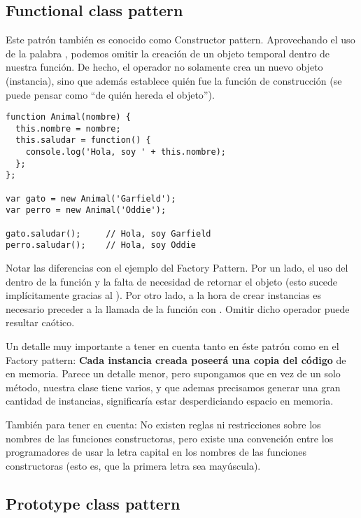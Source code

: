 \subsection{Functional class pattern}

Este patrón también es conocido como Constructor pattern. Aprovechando el uso de la palabra , podemos omitir la creación de un objeto temporal dentro de nuestra función. De hecho, el operador  no solamente crea un nuevo objeto (instancia), sino que además establece quién fue la función de construcción (se puede pensar como "`de quién hereda el objeto"').

\begin{lstlisting}[title={Functional class pattern}]
function Animal(nombre) {
  this.nombre = nombre;
  this.saludar = function() {
    console.log('Hola, soy ' + this.nombre);
  };
};

var gato = new Animal('Garfield');
var perro = new Animal('Oddie');

gato.saludar();		// Hola, soy Garfield
perro.saludar();	// Hola, soy Oddie
\end{lstlisting}

Notar las diferencias con el ejemplo del Factory Pattern. Por un lado, el uso del  dentro de la función y la falta de necesidad de retornar el objeto (esto sucede implícitamente gracias al ). Por otro lado, a la hora de crear instancias es necesario preceder a la llamada de la función con . Omitir dicho operador puede resultar caótico.

Un detalle muy importante a tener en cuenta tanto en éste patrón como en el Factory pattern: \textbf{Cada instancia creada poseerá una copia del código} de  en memoria. Parece un detalle menor, pero supongamos que en vez de un solo método, nuestra clase tiene varios, y que ademas precisamos generar una gran cantidad de instancias, significaría estar desperdiciando espacio en memoria.

También para tener en cuenta: No existen reglas ni restricciones sobre los nombres de las funciones constructoras, pero existe una convención entre los programadores de usar la letra capital en los nombres de las funciones constructoras (esto es, que la primera letra sea mayúscula).

\subsection{Prototype class pattern}

